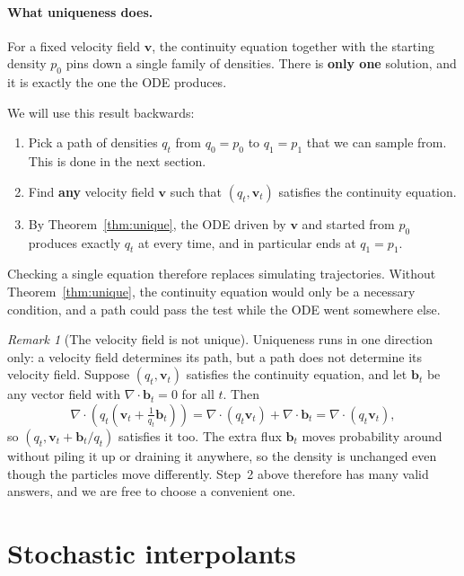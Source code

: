 \documentclass[11pt,a4paper]{article}
\numberwithin{equation}{section}     %
\theoremstyle{plain}        %
\theoremstyle{definition}   %
\theoremstyle{remark}       %
\newtheorem{remark}[theorem]{Remark}
\begin{document}
\paragraph{What uniqueness does.} For a fixed velocity field $\mathbf{v}$, the continuity equation together with the starting density $p_0$ pins down a single family of densities. There is \textbf{only one} solution, and it is exactly the one the ODE produces.

We will use this result backwards:
\begin{enumerate}
\item Pick a path of densities $q_t$ from $q_0=p_0$ to $q_1=p_1$ that we can sample from. This is done in the next section.
\item Find \textbf{any} velocity field $\mathbf{v}$ such that $(q_t,\mathbf{v}_t)$ satisfies the continuity equation.
\item By Theorem~\ref{thm:unique}, the ODE driven by $\mathbf{v}$ and started from $p_0$ produces exactly $q_t$ at every time, and in particular ends at $q_1=p_1$.
\end{enumerate}
Checking a single equation therefore replaces simulating trajectories. Without Theorem~\ref{thm:unique}, the continuity equation would only be a necessary condition, and a path could pass the test while the ODE went somewhere else.

\begin{remark}[The velocity field is not unique]\label{rem:nonunique}
Uniqueness runs in one direction only: a velocity field determines its path, but a path does not determine its velocity field. Suppose $(q_t,\mathbf{v}_t)$ satisfies the continuity equation, and let $\mathbf{b}_t$ be any vector field with $\nabla\cdot\mathbf{b}_t=0$ for all $t$. Then
\[
\nabla\cdot\left(q_t\left(\mathbf{v}_t+\tfrac{1}{q_t}\mathbf{b}_t\right)\right)=\nabla\cdot\left(q_t\mathbf{v}_t\right)+\nabla\cdot\mathbf{b}_t=\nabla\cdot\left(q_t\mathbf{v}_t\right),
\]
so $(q_t,\mathbf{v}_t+\mathbf{b}_t/q_t)$ satisfies it too. The extra flux $\mathbf{b}_t$ moves probability around without piling it up or draining it anywhere, so the density is unchanged even though the particles move differently. Step~2 above therefore has many valid answers, and we are free to choose a convenient one.
\end{remark}

\newpage

\section{Stochastic interpolants}\label{sec:interp}
\end{document}
